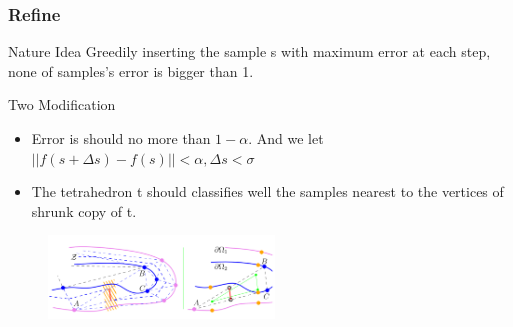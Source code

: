 \documentclass{beamer}
\begin{document}

\begin{frame}
\frametitle{Refine}
\begin{block}{Nature Idea}
  Greedily inserting the sample s with maximum error at each step, none of samples's error is bigger than 1.
\end{block}
\begin{block}{Two Modification}
   \begin{itemize}
     \item Error is should no more than $1-\alpha$. And we let $||f(s+\Delta s)-f(s)||<\alpha, \Delta s < \sigma$
     \item The tetrahedron t should classifies well the samples nearest to the vertices of shrunk copy of t.
   \end{itemize}
\end{block}
\begin{figure}[h]
  \includegraphics[width=6cm]{shrunk}
\end{figure}
\end{frame}
\end{document}
